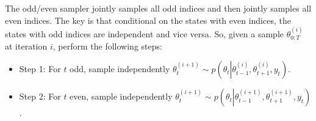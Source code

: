 \documentclass{article}
\begin{document}
The odd/even sampler jointly samples all odd indices and then jointly samples all even indices. The key is that conditional on the states with even indices, the states with odd indices are independent and vice versa. So, given a sample $\theta_{0:T}^{(i)}$ at iteration $i$, perform the following steps:

\begin{itemize}
\item Step 1: For $t$ odd, sample independently $\theta_t^{(i+1)} \sim p\left(\theta_t\left|\theta_{t-1}^{(i)},\theta_{t+1}^{(i)},y_t\right.\right)$.
\item Step 2: For $t$ even, sample independently $\theta_t^{(i+1)} \sim p\left(\theta_t\left|\theta_{t-1}^{(i+1)},\theta_{t+1}^{(i+1)},y_t\right.\right)$.
\end{itemize}
\end{document}
